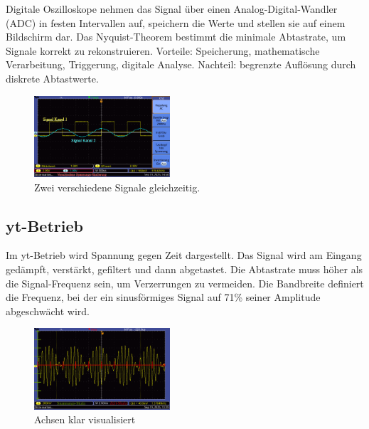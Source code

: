 Digitale Oszilloskope nehmen das Signal über einen Analog-Digital-Wandler (ADC) in festen Intervallen auf, speichern die Werte und stellen sie auf einem Bildschirm dar. Das Nyquist-Theorem bestimmt die minimale Abtastrate, um Signale korrekt zu rekonstruieren. Vorteile: Speicherung, mathematische Verarbeitung, Triggerung, digitale Analyse. Nachteil: begrenzte Auflösung durch diskrete Abtastwerte.
\begin{figure} [h!]
    \centering
        \includegraphics[width=0.45\textwidth]{img/25/2Kanal.pdf}
    \caption{Zwei verschiedene Signale gleichzeitig.}
\end{figure}


\subsection{yt-Betrieb}
Im yt-Betrieb wird Spannung gegen Zeit dargestellt. Das Signal wird am Eingang gedämpft, verstärkt, gefiltert und dann abgetastet. Die Abtastrate muss höher als die Signal-Frequenz sein, um Verzerrungen zu vermeiden. Die Bandbreite definiert die Frequenz, bei der ein sinusförmiges Signal auf 71\% seiner Amplitude abgeschwächt wird.
\begin{figure} [h!]
    \centering
        \includegraphics[width=0.45\textwidth]{img/25/yt-Achsen.pdf}
    \caption{Achsen klar visualisiert}
\end{figure}

